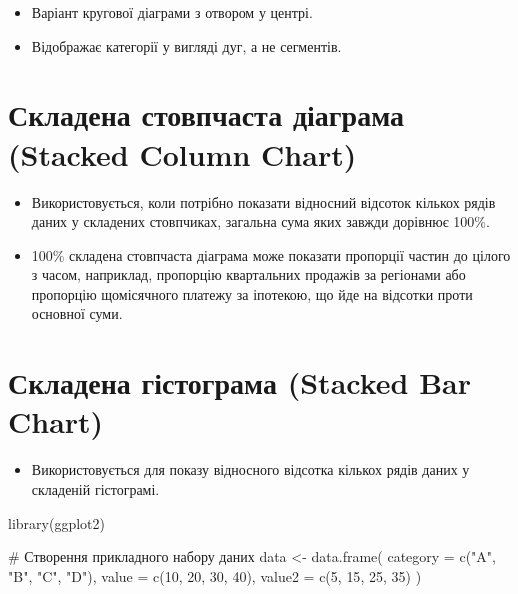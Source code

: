 \documentclass[
  letterpaper,
  DIV=11,
  numbers=noendperiod]{scrreprt}
\newenvironment{Shaded}{\begin{snugshade}}{\end{snugshade}}
\newcommand{\AttributeTok}[1]{\textcolor[rgb]{0.40,0.45,0.13}{#1}}
\newcommand{\CommentTok}[1]{\textcolor[rgb]{0.37,0.37,0.37}{#1}}
\newcommand{\DecValTok}[1]{\textcolor[rgb]{0.68,0.00,0.00}{#1}}
\newcommand{\FunctionTok}[1]{\textcolor[rgb]{0.28,0.35,0.67}{#1}}
\newcommand{\NormalTok}[1]{\textcolor[rgb]{0.00,0.23,0.31}{#1}}
\newcommand{\OtherTok}[1]{\textcolor[rgb]{0.00,0.23,0.31}{#1}}
\newcommand{\StringTok}[1]{\textcolor[rgb]{0.13,0.47,0.30}{#1}}
\providecommand{\tightlist}{%
  \setlength{\itemsep}{0pt}\setlength{\parskip}{0pt}}\usepackage{longtable,booktabs,array}
\begin{document}
\begin{itemize}
\tightlist
\item
  Варіант кругової діаграми з отвором у центрі.
\item
  Відображає категорії у вигляді дуг, а не сегментів.
\end{itemize}

\section{Складена стовпчаста діаграма (Stacked Column
Chart)}\label{ux441ux43aux43bux430ux434ux435ux43dux430-ux441ux442ux43eux432ux43fux447ux430ux441ux442ux430-ux434ux456ux430ux433ux440ux430ux43cux430-stacked-column-chart}

\begin{itemize}
\tightlist
\item
  Використовується, коли потрібно показати відносний відсоток кількох
  рядів даних у складених стовпчиках, загальна сума яких завжди дорівнює
  100\%.
\item
  100\% складена стовпчаста діаграма може показати пропорції частин до
  цілого з часом, наприклад, пропорцію квартальних продажів за регіонами
  або пропорцію щомісячного платежу за іпотекою, що йде на відсотки
  проти основної суми.
\end{itemize}

\section{Складена гістограма (Stacked Bar
Chart)}\label{ux441ux43aux43bux430ux434ux435ux43dux430-ux433ux456ux441ux442ux43eux433ux440ux430ux43cux430-stacked-bar-chart}

\begin{itemize}
\tightlist
\item
  Використовується для показу відносного відсотка кількох рядів даних у
  складеній гістограмі.
\end{itemize}

\begin{Shaded}
\begin{Highlighting}[]
\FunctionTok{library}\NormalTok{(ggplot2)}

\CommentTok{\# Створення прикладного набору даних}
\NormalTok{data }\OtherTok{\textless{}{-}} \FunctionTok{data.frame}\NormalTok{(}
  \AttributeTok{category =} \FunctionTok{c}\NormalTok{(}\StringTok{"A"}\NormalTok{, }\StringTok{"B"}\NormalTok{, }\StringTok{"C"}\NormalTok{, }\StringTok{"D"}\NormalTok{),}
  \AttributeTok{value =} \FunctionTok{c}\NormalTok{(}\DecValTok{10}\NormalTok{, }\DecValTok{20}\NormalTok{, }\DecValTok{30}\NormalTok{, }\DecValTok{40}\NormalTok{),}
  \AttributeTok{value2 =} \FunctionTok{c}\NormalTok{(}\DecValTok{5}\NormalTok{, }\DecValTok{15}\NormalTok{, }\DecValTok{25}\NormalTok{, }\DecValTok{35}\NormalTok{)}
\NormalTok{)}
\end{Highlighting}
\end{Shaded}
\end{document}
